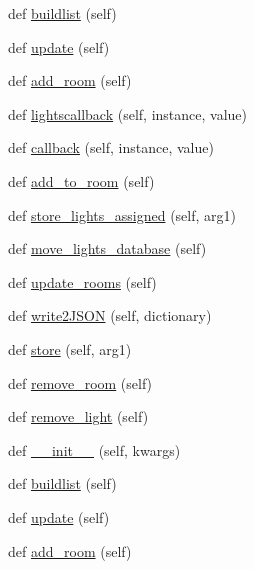 \begin{DoxyCompactItemize}
\item 
def \hyperlink{classTestingGUI_1_1LightsView_ad567fc119c87bdf050d2d105cffb102e}{buildlist} (self)
\item 
def \hyperlink{classTestingGUI_1_1LightsView_ae28189742abd26346c227385fe8866c7}{update} (self)
\item 
def \hyperlink{classTestingGUI_1_1LightsView_ab04e59790bba8440f9f1d65e84bc8ae6}{add\+\_\+room} (self)
\item 
def \hyperlink{classTestingGUI_1_1LightsView_abc44bd1d87c0d060890ad095b6195d27}{lightscallback} (self, instance, value)
\item 
def \hyperlink{classTestingGUI_1_1LightsView_a6868b6f77d43e03f6568b62169c9b19c}{callback} (self, instance, value)
\item 
def \hyperlink{classTestingGUI_1_1LightsView_a38460cbc7553198ef9a613d09919e077}{add\+\_\+to\+\_\+room} (self)
\item 
def \hyperlink{classTestingGUI_1_1LightsView_a3ff5b4674219060370bd91c84e99513c}{store\+\_\+lights\+\_\+assigned} (self, arg1)
\item 
def \hyperlink{classTestingGUI_1_1LightsView_ad2a97175fc114e694c6fe598361c6334}{move\+\_\+lights\+\_\+database} (self)
\item 
def \hyperlink{classTestingGUI_1_1LightsView_add6c257a4625658791c08aca275dbe4d}{update\+\_\+rooms} (self)
\item 
def \hyperlink{classTestingGUI_1_1LightsView_a363b48af2153effb586500f5ca0f371d}{write2\+J\+S\+ON} (self, dictionary)
\item 
def \hyperlink{classTestingGUI_1_1LightsView_a956aabd6c68ac0028a5dbc46ae9475ad}{store} (self, arg1)
\item 
def \hyperlink{classTestingGUI_1_1LightsView_a5f41c66493303b7174b335356d4deee5}{remove\+\_\+room} (self)
\item 
def \hyperlink{classTestingGUI_1_1LightsView_aa302b8817251a5f3c0f2c0d153073399}{remove\+\_\+light} (self)
\item 
def \hyperlink{classTestingGUI_1_1LightsView_ae63565dfb2328abb68fa8751284425a9}{\+\_\+\+\_\+init\+\_\+\+\_\+} (self, kwargs)
\item 
def \hyperlink{classTestingGUI_1_1LightsView_ad567fc119c87bdf050d2d105cffb102e}{buildlist} (self)
\item 
def \hyperlink{classTestingGUI_1_1LightsView_ae28189742abd26346c227385fe8866c7}{update} (self)
\item 
def \hyperlink{classTestingGUI_1_1LightsView_ab04e59790bba8440f9f1d65e84bc8ae6}{add\+\_\+room} (self)

\end{DoxyCompactItemize}

